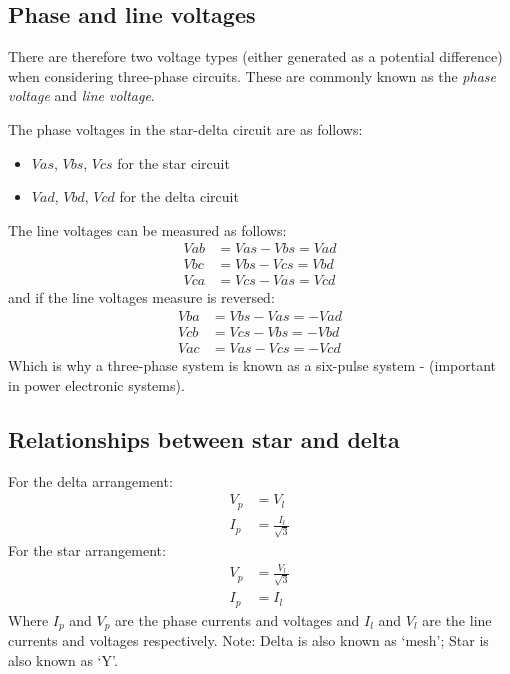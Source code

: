 \documentclass[class=report, crop=false, 12pt,a4paper]{standalone}
\begin{document}
\subsection{Phase and line voltages}
There are therefore two voltage types (either generated as a potential difference) when considering three-phase circuits. These are commonly known as the \textit{phase voltage} and \textit{line voltage}.

The phase voltages in the star-delta circuit are as follows:
\begin{itemize}
	\item $Vas$, $Vbs$, $Vcs$ for the star circuit
	\item $Vad$, $Vbd$, $Vcd$ for the delta circuit
\end{itemize}
The line voltages can be measured as follows:
\begin{align}
	Vab & = Vas - Vbs = Vad \\
	Vbc & = Vbs - Vcs = Vbd \\
	Vca & = Vcs - Vas = Vcd
\end{align}
and if the line voltages measure is reversed:
\begin{align}
	Vba & = Vbs - Vas = -Vad \\
	Vcb & = Vcs - Vbs = -Vbd \\
	Vac & = Vas - Vcs = -Vcd
\end{align}
Which is why a three-phase system is known as a six-pulse system - (important in power electronic systems).
\subsection{Relationships between star and delta}
For the delta arrangement:
\begin{align}
	V_p & = V_l                  \\
	I_p & = \frac{I_l}{\sqrt{3}}
\end{align}
For the star arrangement:
\begin{align}
	V_p & = \frac{V_l}{\sqrt{3}} \\
	I_p & = I_l
\end{align}
Where $I_p$ and $V_p$ are the phase currents and voltages and $I_l$ and $V_l$ are the line currents and voltages respectively. Note: Delta is also known as `mesh'; Star is also known as `Y'.
\end{document}
